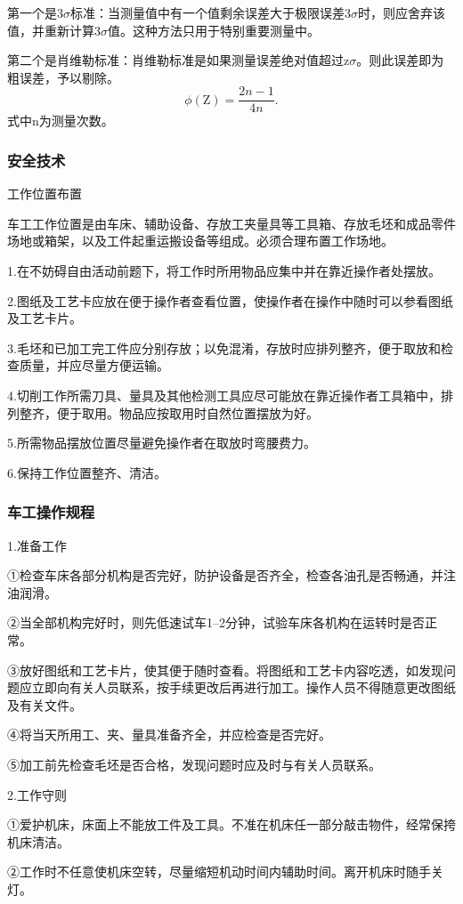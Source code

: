 \documentclass{ctexbook}
\begin{document}
第一个是3$\sigma$标准：当测量值中有一个值剩余误差大于极限误差3$\sigma$时，则应舍弃该值，并重新计算3$\sigma$值。这种方法只用于特别重要测量中。

第二个是肖维勒标准：肖维勒标准是如果测量误差绝对值超过z$\sigma$。则此误差即为粗误差，予以剔除。
\begin{equation*}
	\phi (\text{Z})=\frac{2n-1}{4n}.
\end{equation*}
式中n为测量次数。
\subsubsection{安全技术}
工作位置布置

车工工作位置是由车床、辅助设备、存放工夹量具等工具箱、存放毛坯和成品零件场地或箱架，以及工件起重运搬设备等组成。必须合理布置工作场地。

1.在不妨碍自由活动前题下，将工作时所用物品应集中并在靠近操作者处摆放。

2.图纸及工艺卡应放在便于操作者查看位置，使操作者在操作中随时可以参看图纸及工艺卡片。

3.毛坯和已加工完工件应分别存放；以免混淆，存放时应排列整齐，便于取放和检查质量，并应尽量方便运输。

4.切削工作所需刀具、量具及其他检测工具应尽可能放在靠近操作者工具箱中，排列整齐，便于取用。物品应按取用时自然位置摆放为好。

5.所需物品摆放位置尽量避免操作者在取放时弯腰费力。

6.保持工作位置整齐、清洁。
\subsubsection{车工操作规程}
1.准备工作

①检查车床各部分机构是否完好，防护设备是否齐全，检查各油孔是否畅通，并注油润滑。

②当全部机构完好时，则先低速试车1--2分钟，试验车床各机构在运转时是否正常。

③放好图纸和工艺卡片，使其便于随时查看。将图纸和工艺卡内容吃透，如发现问题应立即向有关人员联系，按手续更改后再进行加工。操作人员不得随意更改图纸及有关文件。

④将当天所用工、夹、量具准备齐全，并应检查是否完好。

⑤加工前先检查毛坯是否合格，发现问题时应及时与有关人员联系。

2.工作守则

①爱护机床，床面上不能放工件及工具。不准在机床任一部分敲击物件，经常保挎机床清洁。

②工作时不任意使机床空转，尽量缩短机动时间内辅助时间。离开机床时随手关灯。
\end{document}
